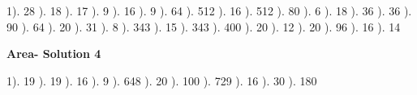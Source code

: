 \documentclass{article}%
\begin{document}
1). 28%
). 18%
). 17%
). 9%
). 16%
). 9%
). 64%
). 512%
). 16%
). 512%
). 80%
). 6%
). 18%
). 36%
). 36%
). 90%
). 64%
). 20%
). 31%
). 8%
). 343%
). 15%
). 343%
). 400%
). 20%
). 12%
). 20%
). 96%
). 16%
). 14%
\newline%
\newpage%
\large%
\begin{center}%
\textbf{Area- Solution 4}%
\newline%
\end{center} \normalsize%
1). 19%
). 19%
). 16%
). 9%
). 648%
). 20%
). 100%
). 729%
). 16%
). 30%
). 180%
\newline%
\end{document}
